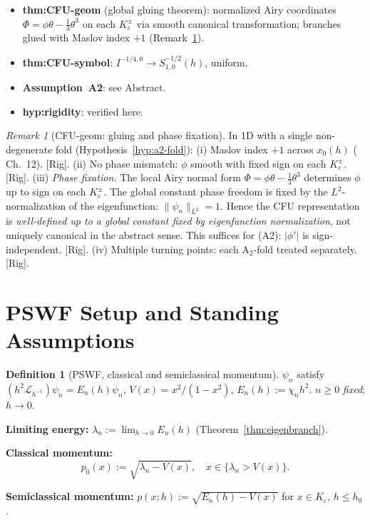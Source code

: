 \documentclass[12pt,a4paper]{amsart}
\theoremstyle{definition}
\newtheorem{definition}[theorem]{Definition}
\theoremstyle{remark}
\newtheorem{remark}[theorem]{Remark}
\newcommand{\Rig}{\textup{[Rig]}}
\begin{document}
\begin{itemize}
\item \textbf{thm:CFU-geom} (global gluing theorem):
  normalized Airy coordinates $\Phi=\phi\theta-\tfrac13\theta^3$
  on each $K_\varepsilon^\pm$ via smooth canonical transformation;
  branches glued with Maslov index $+1$
  (Remark~\ref{rem:cfu-geom-nontrivial}).
\item \textbf{thm:CFU-symbol}: $I^{-1/4,0}\to S^{-1/2}_{1,0}(h)$, uniform.
\item \textbf{Assumption~A2}: see Abstract.
\item \textbf{hyp:rigidity}: verified here.
\end{itemize}

\begin{remark}[CFU-geom: gluing and phase fixation]
\label{rem:cfu-geom-nontrivial}
In 1D with a single non-degenerate fold (Hypothesis~\ref{hyp:a2-fold}):
(i) Maslov index $+1$ across $x_0(h)$ (\cite{Zworski2012} Ch.~12). \Rig.
(ii) No phase mismatch: $\phi$ smooth with fixed sign on each $K_\varepsilon^\pm$. \Rig.
(iii) \emph{Phase fixation.}
  The local Airy normal form $\Phi=\phi\theta-\tfrac13\theta^3$
  determines $\phi$ up to sign on each $K_\varepsilon^\pm$.
  The global constant phase freedom is fixed by the
  $L^2$-normalization of the eigenfunction: $\|\psi_n\|_{L^2}=1$.
  Hence the CFU representation is
  \emph{well-defined up to a global constant fixed by eigenfunction normalization},
  not uniquely canonical in the abstract sense.
  This suffices for (A2): $|\phi'|$ is sign-independent. \Rig.
(iv) Multiple turning points: each A$_2$-fold treated separately. \Rig.
\end{remark}

\section{PSWF Setup and Standing Assumptions}
\label{sec:pswf}

\begin{definition}[PSWF, classical and semiclassical momentum]
\label{def:pswf-p0}
$\psi_n$ satisfy $(h^2\mathcal{L}_{h^{-1}})\psi_n=E_n(h)\psi_n$,
$V(x)=x^2/(1-x^2)$, $E_n(h):=\chi_n h^2$.
$n\ge 0$ \emph{fixed}; $h\to 0$.

\noindent\textbf{Limiting energy:}
$\lambda_n:=\lim_{h\to 0}E_n(h)$ (Theorem~\ref{thm:eigenbranch}).

\noindent\textbf{Classical momentum:}
\begin{equation}\label{eq:p0-def}
  p_0(x):=\sqrt{\lambda_n-V(x)},\quad x\in\{\lambda_n>V(x)\}.
\end{equation}

\noindent\textbf{Semiclassical momentum:}
$p(x;h):=\sqrt{E_n(h)-V(x)}$ for $x\in K_\varepsilon$, $h\le h_0$.
\end{definition}
\end{document}
